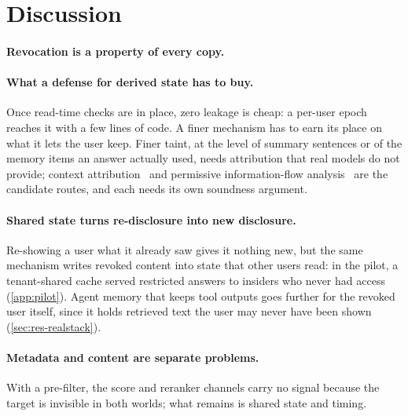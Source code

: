 \section{Discussion}
\label{sec:discussion}

\paragraph{Revocation is a property of every copy.}

\paragraph{What a defense for derived state has to buy.}
Once read-time checks are in place, zero leakage is cheap: a per-user epoch reaches it with a few lines
of code. A finer mechanism has to earn its place on what it lets the user keep.  Finer taint, at the level of summary sentences or of
the memory items an answer actually used, needs attribution that real models do not provide; context
attribution~\cite{cohenwang2024contextcite} and permissive information-flow
analysis~\cite{siddiqui2024permissive} are the candidate routes, and each needs its own soundness
argument.

\paragraph{Shared state turns re-disclosure into new disclosure.}
Re-showing a user what it already saw gives it nothing new, but the same mechanism writes revoked
content into state that other users read: in the pilot, a tenant-shared cache served restricted
answers to insiders who never had access (\cref{app:pilot}). Agent memory that keeps tool outputs
goes further for the revoked user itself, since it holds retrieved text the user may never have been
shown (\cref{sec:res-realstack}).

\paragraph{Metadata and content are separate problems.}
With a pre-filter, the score and reranker channels carry no signal because the target is invisible in
both worlds; what remains is shared state and timing.

